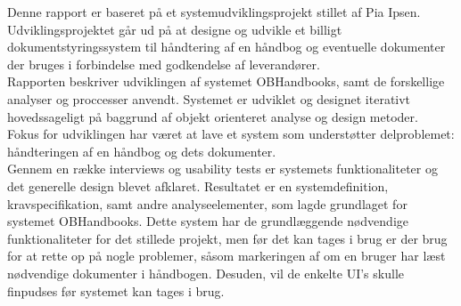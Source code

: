 Denne rapport er baseret på et systemudviklingsprojekt stillet af Pia Ipsen. 
Udviklingsprojektet går ud på at designe og udvikle et billigt dokumentstyringssystem til håndtering af en håndbog og eventuelle dokumenter der bruges i forbindelse med godkendelse af leverandører.\\

Rapporten beskriver udviklingen af systemet OBHandbooks, samt de forskellige analyser og proccesser anvendt.
Systemet er udviklet og designet iterativt hovedssageligt på baggrund af objekt orienteret analyse og design metoder.\\

Fokus for udviklingen har været at lave et system som understøtter delproblemet: håndteringen af en håndbog og dets dokumenter.
\\
Gennem en række interviews og usability tests er systemets funktionaliteter og det generelle design blevet afklaret.
Resultatet er en systemdefinition, kravspecifikation, samt andre analyseelementer, som lagde grundlaget for systemet OBHandbooks.
Dette system har de grundlæggende nødvendige funktionaliteter for det stillede projekt, men før det kan tages i brug er der brug for at rette op på nogle problemer, såsom markeringen af om en bruger har læst nødvendige dokumenter i håndbogen.
Desuden, vil de enkelte UI's skulle finpudses før systemet kan tages i brug.
